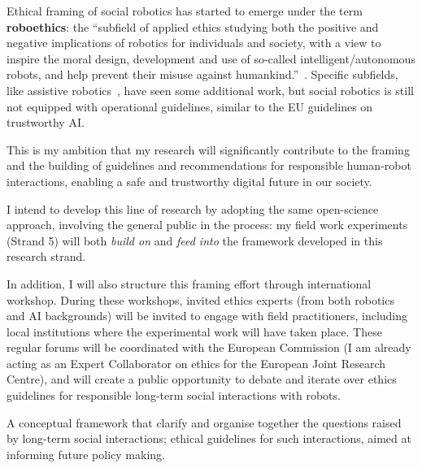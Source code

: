 Ethical framing of social robotics has started to
emerge under the term \textbf{roboethics}: the ``subfield of applied ethics
studying both the positive and negative implications of robotics for individuals
and society, with a view to inspire the moral design, development and use of
so-called intelligent/autonomous robots, and help prevent their misuse against
humankind.''~\parencite{allen2011robot}. Specific subfields, like assistive
robotics~\parencite{sharkey2012granny}, have seen some additional work, but social
robotics is still not equipped with operational guidelines, similar to the EU
guidelines on trustworthy AI.

This is my ambition that my research will significantly contribute to the
framing and the building of guidelines and recommendations for responsible
human-robot interactions, enabling a safe and trustworthy  digital future in our
society.

I intend to develop this line of research by adopting the same open-science
approach, involving the general public in the process: my field work
experiments (Strand 5) will both \emph{build on} and
\emph{feed into} the framework developed in this research strand.

In addition, I will also structure this framing effort through international
workshop. During these workshops, invited ethics experts (from both robotics and
AI backgrounds) will be invited to engage with field practitioners, including
local institutions where the experimental work will have taken place. These
regular forums will be coordinated with the European Commission (I am already
acting as an Expert Collaborator on ethics for the European Joint Research
Centre), and will create a public opportunity to debate and iterate over
ethics guidelines for responsible long-term social interactions with robots.

\begin{outcome}{4}
A conceptual framework that clarify and organise together the questions raised
by long-term social interactions; ethical guidelines for such
interactions, aimed at informing future policy making.

\end{outcome}



